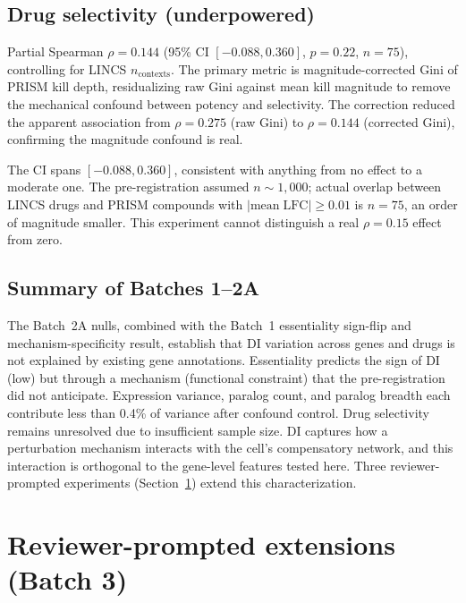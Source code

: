 \documentclass[11pt]{article}
\begin{document}
\subsection{Drug selectivity (underpowered)}

Partial Spearman $\rho = 0.144$ (95\% CI $[-0.088, 0.360]$,
$p = 0.22$, $n = 75$), controlling for LINCS $n_{\mathrm{contexts}}$.
The primary metric is magnitude-corrected Gini of PRISM kill depth,
residualizing raw Gini against mean kill magnitude to remove the
mechanical confound between potency and selectivity.  The correction
reduced the apparent association from $\rho = 0.275$ (raw Gini) to
$\rho = 0.144$ (corrected Gini), confirming the magnitude confound is
real.

The CI spans $[-0.088, 0.360]$, consistent with anything from no effect
to a moderate one.  The pre-registration assumed $n \sim 1{,}000$;
actual overlap between LINCS drugs and PRISM compounds with
$|\mathrm{mean\;LFC}| \geq 0.01$ is $n = 75$, an order of magnitude
smaller.  This experiment cannot distinguish a real $\rho = 0.15$ effect
from zero.


\subsection{Summary of Batches 1--2A}

The Batch~2A nulls, combined with the Batch~1 essentiality sign-flip
and mechanism-specificity result, establish that DI variation across
genes and drugs is not explained by existing gene annotations.
Essentiality predicts the sign of DI (low) but through a mechanism
(functional constraint) that the pre-registration did not anticipate.
Expression variance, paralog count, and paralog breadth each contribute
less than 0.4\% of variance after confound control.  Drug selectivity
remains unresolved due to insufficient sample size.  DI captures how a
perturbation mechanism interacts with the cell's compensatory network,
and this interaction is orthogonal to the gene-level features tested
here.  Three reviewer-prompted experiments (Section~\ref{sec:batch3})
extend this characterization.


\section{Reviewer-prompted extensions (Batch 3)}
\label{sec:batch3}
\end{document}
